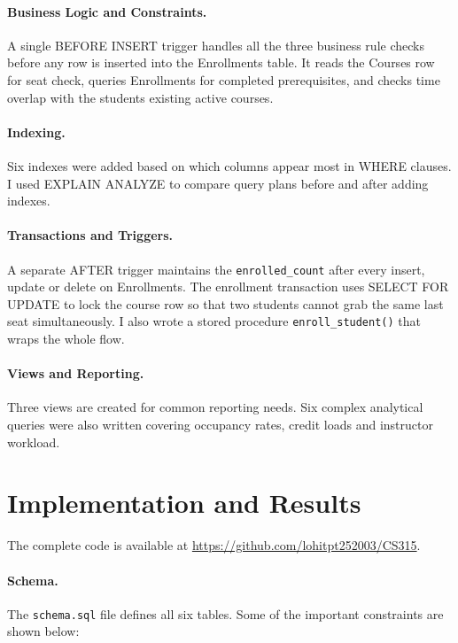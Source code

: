 \documentclass[11pt]{article}
\begin{document}
    \paragraph{Business Logic and Constraints.}
    A single BEFORE INSERT trigger handles all the three business rule checks before
    any row is inserted into the Enrollments table. It reads the Courses row for seat
    check, queries Enrollments for completed prerequisites, and checks time overlap
    with the students existing active courses.

    \paragraph{Indexing.}
    Six indexes were added based on which columns appear most in WHERE clauses.
    I used EXPLAIN ANALYZE to compare query plans before and after adding indexes.

    \paragraph{Transactions and Triggers.}
    A separate AFTER trigger maintains the \texttt{enrolled\_count} after every insert,
    update or delete on Enrollments. The enrollment transaction uses SELECT FOR UPDATE
    to lock the course row so that two students cannot grab the same last seat
    simultaneously. I also wrote a stored procedure \texttt{enroll\_student()} that
    wraps the whole flow.

    \paragraph{Views and Reporting.}
    Three views are created for common reporting needs. Six complex analytical queries
    were also written covering occupancy rates, credit loads and instructor workload.

    \section{Implementation and Results}

    The complete code is available at \url{https://github.com/lohitpt252003/CS315}.

    \paragraph{Schema.}
    The \texttt{schema.sql} file defines all six tables. Some of the important
    constraints are shown below:
\end{document}
